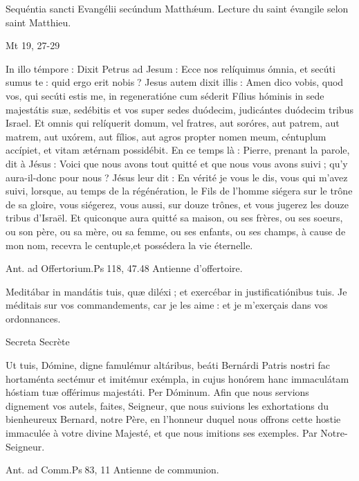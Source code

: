 \begin{paracol}{2}
Sequéntia sancti Evangélii secúndum Matthǽum.
\switchcolumn
Lecture du saint évangile selon saint Matthieu.
\switchcolumn*

Mt 19, 27-29
\switchcolumn

\switchcolumn*

In illo témpore : Dixit Petrus ad  Jesum : Ecce nos relíquimus ómnia, et secúti sumus te : quid ergo erit nobis ? Jesus autem dixit illis : Amen dico vobis, quod vos, qui secúti estis me, in regeneratióne cum séderit Fílius hóminis in sede majestátis suæ, sedébitis et vos super sedes duódecim, judicántes duódecim tribus Israel. Et omnis qui relíquerit domum, vel fratres, aut soróres, aut patrem, aut matrem, aut uxórem, aut fílios, aut agros propter nomen meum, céntuplum accípiet, et vitam ætérnam possidébit.
\switchcolumn
En ce temps là : Pierre, prenant la parole,  dit à Jésus : Voici que nous avons tout quitté et que nous vous avons suivi ; qu’y aura-il-donc pour nous ? Jésus leur dit : En vérité je vous le dis, vous qui m’avez suivi, lorsque, au temps de la régénération, le Fils de l’homme siégera sur le trône de sa gloire, vous siégerez, vous aussi, sur douze trônes, et vous jugerez les douze tribus d’Israël.  Et quiconque aura quitté sa maison, ou ses frères, ou ses soeurs, ou son père, ou sa mère, ou sa femme, ou ses enfants, ou ses champs, à cause de mon nom, recevra le centuple,et possédera la vie éternelle.
\switchcolumn*

Ant. ad Offertorium.\hfill Ps 118, 47.48
\switchcolumn
Antienne d’offertoire.
\switchcolumn*

Meditábar in mandátis tuis, quæ diléxi ; et exercébar in justificatiónibus tuis.
\switchcolumn
Je méditais sur vos commandements, car je les aime : et je m’exerçais dans vos ordonnances.
\switchcolumn*

Secreta
\switchcolumn
Secrète
\switchcolumn*

Ut tuis, Dómine, digne famulémur  altáribus, beáti Bernárdi Patris nostri fac hortaménta sectémur et imitémur exémpla, in cujus honórem hanc immaculátam hóstiam tuæ offérimus majestáti. Per Dóminum.
\switchcolumn
Afin que nous servions dignement  vos autels, faites, Seigneur, que nous suivions les exhortations du bienheureux Bernard, notre Père, en l’honneur duquel nous offrons cette hostie immaculée à votre divine Majesté,  et que nous imitions ses exemples. Par Notre-Seigneur.
\switchcolumn*

Ant. ad Comm.\hfill Ps 83, 11
\switchcolumn
Antienne de communion.
\switchcolumn*


\end{paracol}
